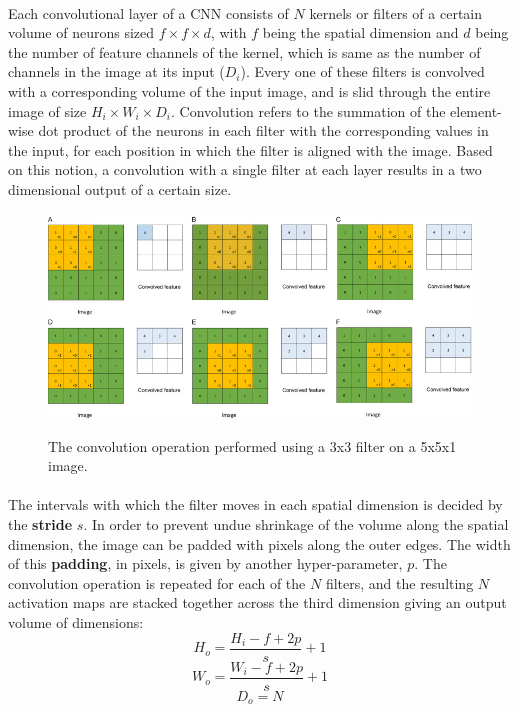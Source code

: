 \documentclass[12pt, a4paper]{report}
\begin{document}
\paragraph{}
Each convolutional layer of a CNN consists of $N$ kernels or filters of a certain volume of neurons sized $f \times f \times d$, with $f$ being the spatial dimension and $d$ being the number of feature channels of the kernel, which is same as the number of channels in the image at its input ($D_{i}$). Every one of these filters is convolved with a corresponding volume of the input image, and is slid through the entire image of size $H_{i} \times W_{i} \times D_{i}$. Convolution refers to the summation of the element-wise dot product of the neurons in each filter with the corresponding values in the input, for each position in which the filter is aligned with the image. Based on this notion, a convolution with a single filter at each layer results in a two dimensional output of a certain size. \cite{cs231n, muruganandham2016semantic, dlai4}
\begin{figure}[h]
\centering
\includegraphics[width=\textwidth]{cnn1.jpg}
\caption{The convolution operation performed using a 3x3 filter on a 5x5x1 image.}\cite{fathi2018deep}
\end{figure}
\paragraph{}
The intervals with which the filter moves in each spatial dimension is decided by the \textbf{stride} $s$. In order to prevent undue shrinkage of the volume along the spatial dimension, the image can be padded with pixels along the outer edges. The width of this \textbf{padding}, in pixels, is given by another hyper-parameter, $p$.\cite{dlai4, muruganandham2016semantic} The convolution operation is repeated for each of the $N$ filters, and the resulting $N$ activation maps are stacked together across the third dimension giving an output volume of dimensions:\\
\begin{displaymath}
H_{o}=\frac{H_{i}-f+2p}{s}+1
\end{displaymath}
\begin{displaymath}
W_{o}=\frac{W_{i}-f+2p}{s}+1
\end{displaymath}
\begin{displaymath}
D_{o}=N
\end{displaymath}
\end{document}
